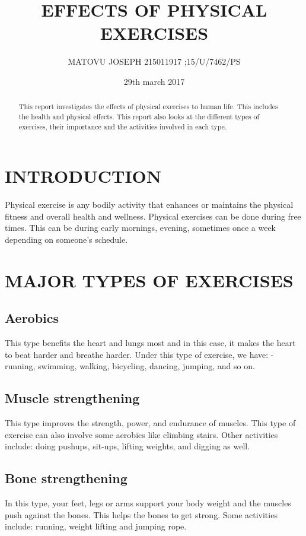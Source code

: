 \documentclass[12pt]{article}
\begin{document}
\title{EFFECTS OF PHYSICAL EXERCISES}
\author{MATOVU JOSEPH  215011917 ;15/U/7462/PS} 
\date{29th march 2017}
\maketitle

\begin{abstract}
This report investigates the effects of physical exercises to human life. This includes the health and physical effects.
This report also looks at the different types of exercises, their importance and the activities involved in each type.
\end{abstract}

\tableofcontents

\section{INTRODUCTION}
Physical exercise is any bodily activity that enhances or maintains the physical fitness and overall health and wellness. Physical exercises can be done during free times. This can be during early mornings, evening, sometimes once a week depending on someone’s schedule. 

\section{MAJOR TYPES OF EXERCISES}

\subsection{Aerobics}
This type benefits the heart and lungs most and in this case, it makes the heart to beat harder and breathe harder. Under this type of exercise, we have: - running, swimming, walking, bicycling, dancing, jumping, and so on.

\subsection{Muscle strengthening}
This type improves the strength, power, and endurance of muscles. This type of exercise can also involve some aerobics like climbing stairs. Other activities include: doing pushups, sit-ups, lifting weights, and digging as well.

\subsection{Bone strengthening}
In this type, your feet, legs or arms support your body weight and the muscles push against the bones. This helps the bones to get strong. Some activities include: running, weight lifting and jumping rope.
\end{document}
